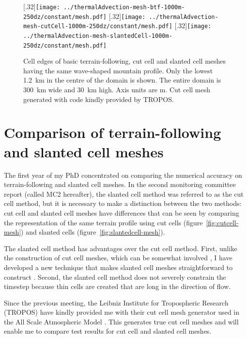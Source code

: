 \documentclass[a4paper,11pt]{article}
\begin{document}
\begin{figure}
	\centering
	[.32\linewidth]{\texttt{[image: ../thermalAdvection-mesh-btf-1000m-250dz/constant/mesh.pdf]}}
	[.32\linewidth]{\texttt{[image: ../thermalAdvection-mesh-cutCell-1000m-250dz/constant/mesh.pdf]}}
	[.32\linewidth]{\texttt{[image: ../thermalAdvection-mesh-slantedCell-1000m-250dz/constant/mesh.pdf]}}
	\caption{Cell edges of basic terrain-following, cut cell and slanted cell meshes having the same wave-shaped mountain profile.  Only the lowest \SI{1.2}{\kilo\meter} in the centre of the domain is shown.  The entire domain is \SI{300}{\kilo\meter} wide and \SI{30}{\kilo\meter} high.  Axis units are \si{\meter}.  Cut cell mesh generated with code kindly provided by TROPOS.}
	\label{fig:meshes}
\end{figure}

\section{Comparison of terrain-following and slanted cell meshes}
The first year of my PhD concentrated on comparing the numerical accuracy on terrain-following and slanted cell meshes.
In the second monitoring committee report (called MC2 hereafter), the slanted cell method was referred to as the cut cell method, but it is necessary to make a distinction between the two methods: cut cell and slanted cell meshes have differences that can be seen by comparing the representation of the same terrain profile using cut cells (figure~\ref{fig:cutcell-mesh}) and slanted cells (figure~\ref{fig:slantedcell-mesh}).

The slanted cell method has advantages over the cut cell method.  First, unlike the construction of cut cell meshes, which can be somewhat involved \citep{hartkopf2011}, I have developed a new technique that makes slanted cell meshes straightforward to construct \citep{shaw-weller2016}.  Second, the slanted cell method does not severely constrain the timestep because thin cells are created that are long in the direction of flow.

Since the previous meeting, the Leibniz Institute for Tropospheric Research (TROPOS) have kindly provided me with their cut cell mesh generator used in the All Scale Atmospheric Model \citep{jaehn2015}.  This generates true cut cell meshes and will enable me to compare test results for cut cell and slanted cell meshes.
\end{document}
